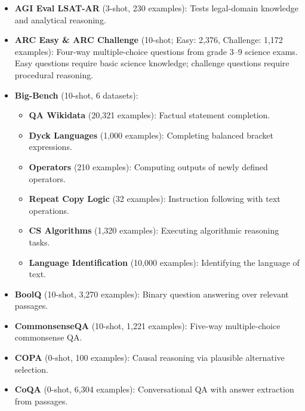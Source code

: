 \documentclass{article}
\begin{document}
\begin{itemize}

  \item \textbf{AGI Eval LSAT-AR} \parencite{zhong2023agieval} (3-shot, 230 examples):
  Tests legal-domain knowledge and analytical reasoning.

  \item \textbf{ARC Easy \& ARC Challenge} \parencite{clark2018arc} (10-shot; Easy: 2,376,
  Challenge: 1,172 examples): Four-way multiple-choice questions from grade 3--9 science exams.
  Easy questions require basic science knowledge; challenge questions require procedural
  reasoning.

  \item \textbf{Big-Bench} \parencite{bigbench2023} (10-shot, 6 datasets):
  \begin{itemize}
    \item \textbf{QA Wikidata} (20,321 examples): Factual statement completion.
    \item \textbf{Dyck Languages} (1,000 examples): Completing balanced bracket expressions.
    \item \textbf{Operators} (210 examples): Computing outputs of newly defined operators.
    \item \textbf{Repeat Copy Logic} (32 examples): Instruction following with text operations.
    \item \textbf{CS Algorithms} (1,320 examples): Executing algorithmic reasoning tasks.
    \item \textbf{Language Identification} (10,000 examples): Identifying the language of text.
  \end{itemize}

  \item \textbf{BoolQ} \parencite{clark2019boolq} (10-shot, 3,270 examples):
  Binary question answering over relevant passages.

  \item \textbf{CommonsenseQA} \parencite{talmor2019commonsenseqa} (10-shot, 1,221 examples):
  Five-way multiple-choice commonsense QA.

  \item \textbf{COPA} \parencite{roemmele2011copa} (0-shot, 100 examples):
  Causal reasoning via plausible alternative selection.

  \item \textbf{CoQA} \parencite{reddy2019coqa} (0-shot, 6,304 examples):
  Conversational QA with answer extraction from passages.


\end{itemize}
\end{document}

